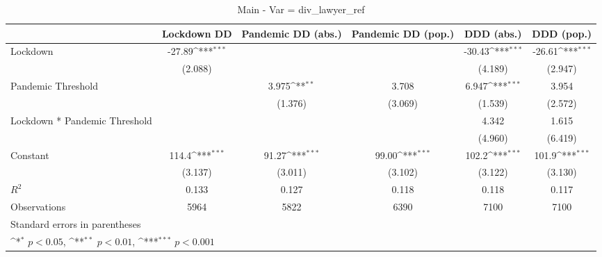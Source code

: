 \documentclass{article}
\begin{document}
{
\def\sym#1{\ifmmode^{#1}\else\(^{#1}\)\fi}
\begin{longtable}{l*{5}{c}}
\caption{Main - Var = div\_lawyer\_ref}\\
\hline\hline\endfirsthead\hline\endhead\hline\endfoot\endlastfoot
                &\multicolumn{1}{c}{Lockdown DD}&\multicolumn{1}{c}{Pandemic DD (abs.)}&\multicolumn{1}{c}{Pandemic DD (pop.)}&\multicolumn{1}{c}{DDD (abs.)}&\multicolumn{1}{c}{DDD (pop.)}\\
\hline
Lockdown        &   -27.89\sym{***}&                  &                  &   -30.43\sym{***}&   -26.61\sym{***}\\
                &  (2.088)         &                  &                  &  (4.189)         &  (2.947)         \\
Pandemic Threshold&                  &    3.975\sym{**} &    3.708         &    6.947\sym{***}&    3.954         \\
                &                  &  (1.376)         &  (3.069)         &  (1.539)         &  (2.572)         \\
Lockdown * Pandemic Threshold&                  &                  &                  &    4.342         &    1.615         \\
                &                  &                  &                  &  (4.960)         &  (6.419)         \\
Constant        &    114.4\sym{***}&    91.27\sym{***}&    99.00\sym{***}&    102.2\sym{***}&    101.9\sym{***}\\
                &  (3.137)         &  (3.011)         &  (3.102)         &  (3.122)         &  (3.130)         \\
\hline
\(R^{2}\)       &    0.133         &    0.127         &    0.118         &    0.118         &    0.117         \\
Observations    &     5964         &     5822         &     6390         &     7100         &     7100         \\
\hline\hline
\multicolumn{6}{l}{\footnotesize Standard errors in parentheses}\\
\multicolumn{6}{l}{\footnotesize \sym{*} \(p<0.05\), \sym{**} \(p<0.01\), \sym{***} \(p<0.001\)}\\
\end{longtable}
}
\end{document}
